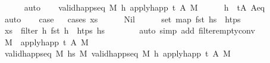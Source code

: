 \begin{isabellebody}
\ \ \ \ \isamarkupfalse%
\ auto\isanewline
\ \ \isamarkupfalse%
\ {\isachardoublequoteopen}valid{\isacharunderscore}{\kern0pt}happ{\isacharunderscore}{\kern0pt}seq\ M\ {\isacharbrackleft}{\kern0pt}h{\isacharprime}{\kern0pt}{\isacharbrackright}{\kern0pt}\ {\isacharparenleft}{\kern0pt}apply{\isacharunderscore}{\kern0pt}happ\ {\isacharparenleft}{\kern0pt}t{\isacharcomma}{\kern0pt}\ A{\isacharprime}{\kern0pt}{\isacharparenright}{\kern0pt}\ M{\isacharparenright}{\kern0pt}{\isachardoublequoteclose}\isanewline
\ \ \ \ \isamarkupfalse%
\ {\isacartoucheopen}h\ {\isacharequal}{\kern0pt}\ {\isacharparenleft}{\kern0pt}t{\isacharcomma}{\kern0pt}A{\isacharparenright}{\kern0pt}{\isacartoucheclose}\ A{\isacharunderscore}{\kern0pt}eq\isanewline
\ \ \ \ \isamarkupfalse%
\ auto\isanewline
\isanewline
\ \ \isamarkupfalse%
\ {\isacharquery}{\kern0pt}case\isanewline
\ \ \isamarkupfalse%
{\isacharparenleft}{\kern0pt}cases\ {\isachardoublequoteopen}xs{\isachardoublequoteclose}{\isacharparenright}{\kern0pt}\isanewline
\ \ \ \ \isamarkupfalse%
\ Nil\isanewline
\ \ \ \ \isamarkupfalse%
\ {\isachardoublequoteopen}set\ {\isacharparenleft}{\kern0pt}map\ fst\ hs{}{\isacharparenright}{\kern0pt}\ {\isasyminter}\ htps\ {\isacharequal}{\kern0pt}\ {\isacharbraceleft}{\kern0pt}{\isacharbraceright}{\kern0pt}{\isachardoublequoteclose}\isanewline
\ \ \ \ \ \ \isamarkupfalse%
\ {\isacartoucheopen}xs\ {\isacharequal}{\kern0pt}\ filter\ {\isacharparenleft}{\kern0pt}{\isasymlambda}h{\isachardot}{\kern0pt}\ fst\ h\ {\isasymin}\ htps{\isacharparenright}{\kern0pt}\ hs{}{\isacartoucheclose}\isanewline
\ \ \ \ \ \ \isamarkupfalse%
\ {\isacharparenleft}{\kern0pt}auto\ simp\ add{\isacharcolon}{\kern0pt}\ filter{\isacharunderscore}{\kern0pt}empty{\isacharunderscore}{\kern0pt}conv{\isacharparenright}{\kern0pt}\isanewline
\ \ \ \ \isamarkupfalse%
\ {\isachardoublequoteopen}M{\isacharprime}{\kern0pt}\ {\isacharequal}{\kern0pt}\ {\isacharparenleft}{\kern0pt}apply{\isacharunderscore}{\kern0pt}happ\ {\isacharparenleft}{\kern0pt}t{\isacharcomma}{\kern0pt}\ A{\isacharprime}{\kern0pt}{\isacharparenright}{\kern0pt}\ M{\isacharparenright}{\kern0pt}{\isachardoublequoteclose}\isanewline
\ \ \ \ \ \ \isamarkupfalse%
\ {\isacartoucheopen}valid{\isacharunderscore}{\kern0pt}happ{\isacharunderscore}{\kern0pt}seq\ M\ hs\ M{\isacharprime}{\kern0pt}{\isacartoucheclose}\ {\isacartoucheopen}valid{\isacharunderscore}{\kern0pt}happ{\isacharunderscore}{\kern0pt}seq\ M\ {\isacharbrackleft}{\kern0pt}h{\isacharbrackright}{\kern0pt}\ {\isacharparenleft}{\kern0pt}apply{\isacharunderscore}{\kern0pt}happ\ {\isacharparenleft}{\kern0pt}t{\isacharcomma}{\kern0pt}\ A{\isacharprime}{\kern0pt}{\isacharparenright}{\kern0pt}\ M{\isacharparenright}{\kern0pt}{\isacartoucheclose}\isanewline

\end{isabellebody}
